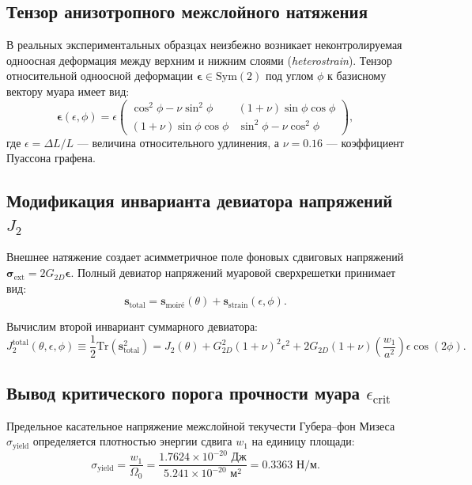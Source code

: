 \documentclass[12pt,a4paper]{article}
\begin{document}
\subsection{Тензор анизотропного межслойного натяжения}
В реальных экспериментальных образцах неизбежно возникает неконтролируемая одноосная деформация между верхним и нижним слоями (\textit{heterostrain}). Тензор относительной одноосной деформации $\boldsymbol{\epsilon} \in \mathrm{Sym}(2)$ под углом $\phi$ к базисному вектору муара имеет вид:
\begin{equation}
\boldsymbol{\epsilon}(\epsilon, \phi) = \epsilon \begin{pmatrix} 
	\cos^2\phi - \nu \sin^2\phi & (1+\nu)\sin\phi\cos\phi \\ 
	(1+\nu)\sin\phi\cos\phi & \sin^2\phi - \nu \cos^2\phi 
\end{pmatrix},
\end{equation}
где $\epsilon = \Delta L / L$ — величина относительного удлинения, а $\nu = 0.16$ — коэффициент Пуассона графена.

\subsection{Модификация инварианта девиатора напряжений $J_2$}
Внешнее натяжение создает асимметричное поле фоновых сдвиговых напряжений $\boldsymbol{\sigma}_{\text{ext}} = 2 G_{2D} \boldsymbol{\epsilon}$. Полный девиатор напряжений муаровой сверхрешетки принимает вид:
\begin{equation}
\mathbf{s}_{\text{total}} = \mathbf{s}_{\text{moir\'e}}(\theta) + \mathbf{s}_{\text{strain}}(\epsilon, \phi).
\end{equation}

Вычислим второй инвариант суммарного девиатора:
\begin{equation}
J_2^{\text{total}}(\theta, \epsilon, \phi) \equiv \frac{1}{2}\mathrm{Tr}(\mathbf{s}_{\text{total}}^2) = J_2(\theta) + G_{2D}^2 (1+\nu)^2 \epsilon^2 + 2 G_{2D} (1+\nu) \left(\frac{w_1}{a^2}\right) \epsilon \cos(2\phi).
\end{equation}

\subsection{Вывод критического порога прочности муара $\epsilon_{\text{crit}}$}
Предельное касательное напряжение межслойной текучести Губера--фон Мизеса $\sigma_{\text{yield}}$ определяется плотностью энергии сдвига $w_1$ на единицу площади:
\begin{equation}
	\sigma_{\text{yield}} = \frac{w_1}{\Omega_0} = \frac{1.7624 \times 10^{-20}\text{ Дж}}{5.241 \times 10^{-20}\text{ м}^2} = \mathbf{0.3363\text{ Н/м}}.
\end{equation}
\end{document}
